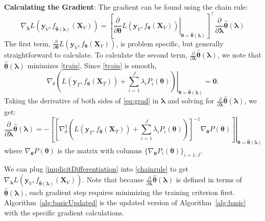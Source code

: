 \documentclass[12pt,letterpaper]{article}
\begin{document}
\noindent
\textbf{Calculating the Gradient}:
The gradient can be found using the chain rule:
\begin{equation}
\nabla_{\boldsymbol{\lambda}} L \left( \boldsymbol{y}_V, f_{\hat{\boldsymbol \theta}(\boldsymbol{\lambda})}(\boldsymbol{X}_V) \right ) = 
\left [
\left . \frac{\partial}{\partial \boldsymbol \theta} L ( \boldsymbol{y}_V, f_{\boldsymbol \theta}(\boldsymbol{X}_V)) \right |_{\boldsymbol \theta=\hat{\boldsymbol \theta}(\boldsymbol \lambda)}
\right ]^\top 
\frac{\partial}{\partial \boldsymbol{\lambda}} \hat{\boldsymbol \theta}(\boldsymbol{\lambda})
\label{chainrule}
\end{equation}
The first term, $\frac{\partial}{\partial \boldsymbol \theta} L ( \boldsymbol{y}_V, f_{\boldsymbol \theta}(\boldsymbol{X}_V))$, is problem specific, but generally straightforward to calculate. To calculate the second term, $\frac{\partial}{\partial \boldsymbol{\lambda}} \hat{\boldsymbol \theta}(\boldsymbol{\lambda})$, we note that $\hat{\boldsymbol \theta}(\boldsymbol{\lambda})$ minimizes \eqref{train}. Since \eqref{train} is smooth,
\begin{equation}
\nabla_\theta 
\left . \left (
L(\boldsymbol{y}_T, f_{\boldsymbol \theta} (\boldsymbol{X}_T)) +
\sum\limits_{i=1}^J \lambda_i P_i(\boldsymbol \theta)
\right ) \right |_{\boldsymbol \theta = \hat {\boldsymbol \theta}(\boldsymbol{\lambda})}
= \boldsymbol{0}.
\label{eq:grad}
\end{equation}
Taking the derivative of both sides of \eqref{eq:grad} in $\boldsymbol{\lambda}$ and solving for $\frac{\partial}{\partial \boldsymbol{\lambda}} \hat{\boldsymbol \theta}(\boldsymbol{\lambda})$, we get:
\begin{equation}
\frac{\partial}{\partial \boldsymbol{\lambda}} \hat{\boldsymbol \theta}(\boldsymbol{\lambda}) = 
- \left . \left [ \left [
 \nabla_\theta^2 \left (  L \left (\boldsymbol{y}_T, f_{\boldsymbol \theta} (\boldsymbol{X}_T) \right)  +  \sum\limits_{i=1}^J \lambda_i P_i(\boldsymbol \theta)  \right )  \right ]^{-1}
\nabla_{\boldsymbol \theta} P(\boldsymbol \theta)
\right ]
\right |_{\boldsymbol \theta = \hat {\boldsymbol \theta}(\boldsymbol{\lambda})}
\label{implicitDifferentiation}
\end{equation}
where $\nabla_{\boldsymbol \theta} P(\boldsymbol \theta)$ is the matrix with columns $\{\nabla_{\boldsymbol \theta} P_i(\boldsymbol \theta)\}_{i=1:J}$.

We can plug \eqref{implicitDifferentiation} into \eqref{chainrule} to get $\nabla_{\boldsymbol{\lambda}} L \left ( \boldsymbol{y}_V, f_{\hat{\boldsymbol \theta}(\boldsymbol{\lambda})}(\boldsymbol{X}_V) \right )$. Note that because $\frac{\partial}{\partial \boldsymbol{\lambda}} \hat{\boldsymbol \theta}(\boldsymbol{\lambda})$ is defined in terms of $\hat{\boldsymbol \theta}\left(\boldsymbol{\lambda}\right)$, each gradient step requires minimizing the training criterion first. Algorithm~\ref{alg:basicUpdated} is the updated version of Algorithm~\ref{alg:basic} with the specific gradient calculations.
\end{document}

